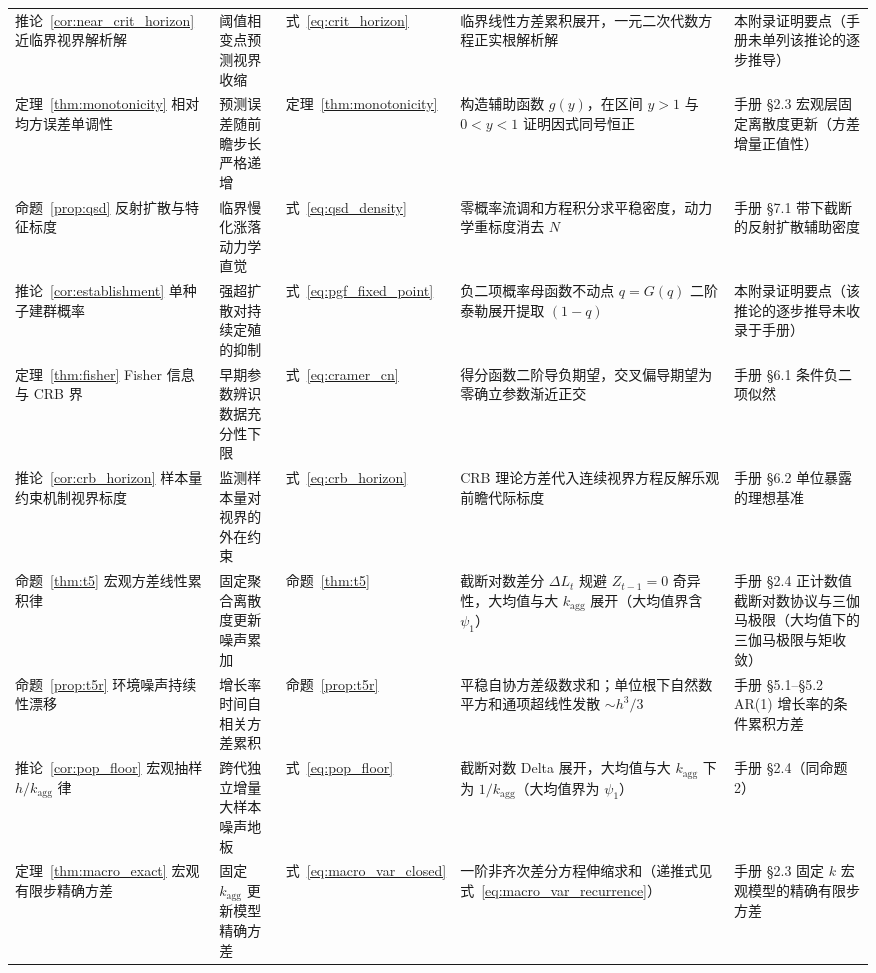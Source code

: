 \documentclass[11pt,a4paper]{article}
\theoremstyle{plain}
\theoremstyle{definition}
\begin{document}
\begin{table}[htbp]
\begin{tabular}{@{}>{\raggedright\arraybackslash}p{2.3cm}>{\raggedright\arraybackslash}p{2.6cm}>{\raggedright\arraybackslash}p{1.6cm}>{\raggedright\arraybackslash}p{4.6cm}>{\raggedright\arraybackslash}p{3.4cm}@{}}
\addlinespace[3pt]
推论~\ref{cor:near_crit_horizon} 近临界视界解析解 & 阈值相变点预测视界收缩 & 式~\eqref{eq:crit_horizon} & 临界线性方差累积展开，一元二次代数方程正实根解析解 & 本附录证明要点（手册未单列该推论的逐步推导） \\
\addlinespace[3pt]
定理~\ref{thm:monotonicity} 相对均方误差单调性 & 预测误差随前瞻步长严格递增 & 定理~\ref{thm:monotonicity} & 构造辅助函数 $g(y)$，在区间 $y>1$ 与 $0<y<1$ 证明因式同号恒正 & 手册 §2.3 宏观层固定离散度更新（方差增量正值性） \\
\addlinespace[3pt]
命题~\ref{prop:qsd} 反射扩散与特征标度 & 临界慢化涨落动力学直觉 & 式~\eqref{eq:qsd_density} & 零概率流调和方程积分求平稳密度，动力学重标度消去 $N$ & 手册 §7.1 带下截断的反射扩散辅助密度 \\
\addlinespace[3pt]
推论~\ref{cor:establishment} 单种子建群概率 & 强超扩散对持续定殖的抑制 & 式~\eqref{eq:pgf_fixed_point} & 负二项概率母函数不动点 $q=G(q)$ 二阶泰勒展开提取 $(1-q)$ & 本附录证明要点（该推论的逐步推导未收录于手册） \\
\addlinespace[3pt]
定理~\ref{thm:fisher} Fisher 信息与 CRB 界 & 早期参数辨识数据充分性下限 & 式~\eqref{eq:cramer_cn} & 得分函数二阶导负期望，交叉偏导期望为零确立参数渐近正交 & 手册 §6.1 条件负二项似然 \\
\addlinespace[3pt]
推论~\ref{cor:crb_horizon} 样本量约束机制视界标度 & 监测样本量对视界的外在约束 & 式~\eqref{eq:crb_horizon} & CRB 理论方差代入连续视界方程反解乐观前瞻代际标度 & 手册 §6.2 单位暴露的理想基准 \\
\addlinespace[3pt]
命题~\ref{thm:t5} 宏观方差线性累积律 & 固定聚合离散度更新噪声累加 & 命题~\ref{thm:t5} & 截断对数差分 $\Delta L_t$ 规避 $Z_{t-1}=0$ 奇异性，大均值与大 $k_{\text{agg}}$ 展开（大均值界含 $\psi_1$） & 手册 §2.4 正计数值截断对数协议与三伽马极限（大均值下的三伽马极限与矩收敛） \\
\addlinespace[3pt]
命题~\ref{prop:t5r} 环境噪声持续性漂移 & 增长率时间自相关方差累积 & 命题~\ref{prop:t5r} & 平稳自协方差级数求和；单位根下自然数平方和通项超线性发散 $\sim h^3/3$ & 手册 §5.1--§5.2 AR(1) 增长率的条件累积方差 \\
\addlinespace[3pt]
推论~\ref{cor:pop_floor} 宏观抽样 $h/k_{\text{agg}}$ 律 & 跨代独立增量大样本噪声地板 & 式~\eqref{eq:pop_floor} & 截断对数 Delta 展开，大均值与大 $k_{\text{agg}}$ 下为 $1/k_{\text{agg}}$（大均值界为 $\psi_1$） & 手册 §2.4（同命题 2） \\
\addlinespace[3pt]
定理~\ref{thm:macro_exact} 宏观有限步精确方差 & 固定 $k_{\text{agg}}$ 更新模型精确方差 & 式~\eqref{eq:macro_var_closed} & 一阶非齐次差分方程伸缩求和（递推式见式~\eqref{eq:macro_var_recurrence}） & 手册 §2.3 固定 $k$ 宏观模型的精确有限步方差 \\

\end{tabular}
\end{table}
\end{document}
